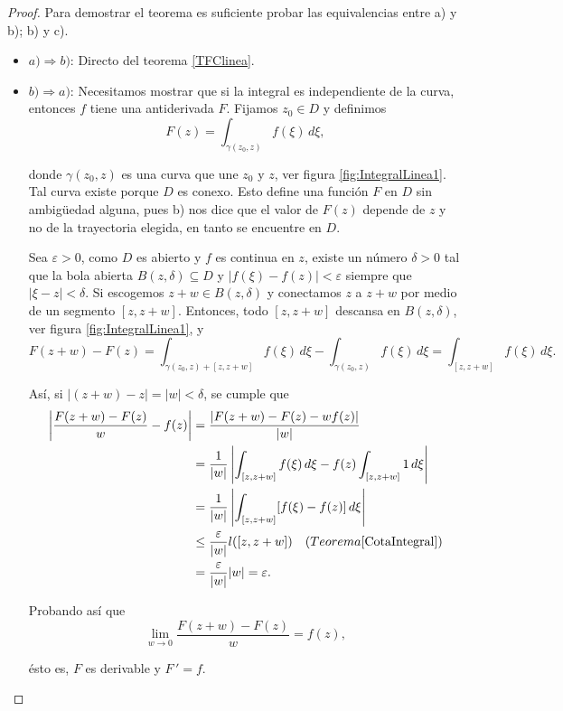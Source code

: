 \begin{proof}
Para demostrar el teorema es suficiente probar las equivalencias entre a) y b); b) y c).

\begin{itemize}
    \item $a) \Rightarrow b)$: Directo del teorema \ref{TFClinea}.
    
    \item $b) \Rightarrow a)$: Necesitamos mostrar que si la integral es independiente de la curva, entonces $f$ tiene una antiderivada $F$. Fijamos $z_0 \in D$ y definimos
    $$F(z) = \int_{\gamma(z_0,z)} f(\xi) \,d\xi,$$
    
    donde $\gamma(z_0,z)$ es una curva que une $z_0$ y $z$, ver figura \ref{fig:IntegralLinea1}. Tal curva existe porque $D$ es conexo. Esto define una función $F$ en $D$ sin ambigüedad alguna, pues b) nos dice que el valor de $F(z)$ depende de $z$ y no de la trayectoria elegida, en tanto se encuentre en $D$. 
    
    Sea $\varepsilon > 0$, como $D$ es abierto y $f$ es continua en $z$, existe un número $\delta > 0$ tal que la bola abierta $B(z, \delta) \subseteq D$ y $|f(\xi) - f(z)| < \varepsilon$ siempre que $|\xi - z| < \delta$. Si escogemos $z+w \in B(z, \delta)$ y conectamos $z$ a $z+w$ por medio de un segmento $[z,z+w]$. Entonces, todo $[z,z+w]$ descansa en $B(z,\delta)$, ver figura \ref{fig:IntegralLinea1},  y
    $$F(z+w) - F(z) = \int_{\gamma(z_0,z) + [z,z+w]} f(\xi) \,d\xi - \int_{\gamma(z_0,z)} f(\xi) \,d\xi = \int_{[z,z+w]} f(\xi) \,d\xi.$$
    
    Así, si $|(z+w)-z| = |w| < \delta$, se cumple que
    \begin{align*}
       \left|\frac{F(z+w)-F(z)}{w} - f(z)\right| &=  \frac{|F(z+w) - F(z) - w f(z)|}{|w|} \\
       &= \frac{1}{|w|} \left| \int_{[z,z+w]} f(\xi) \,d\xi -f(z) \int_{[z,z+w]} 1 \,d\xi  \right| \\
       &= \frac{1}{|w|} \left| \int_{[z,z+w]} [f(\xi) - f(z)] \,d\xi   \right| \\
       &\leq \frac{\varepsilon}{|w|}l([z,z+w]) \quad (Teorema \ref{CotaIntegral})\\
       &= \frac{\varepsilon}{|w|} |w| = \varepsilon.
    \end{align*}

Probando así que
$$\lim_{w \to 0} \frac{F(z+w)- F(z)}{w} = f(z),$$

ésto es, $F$ es derivable y $F\,' = f$.


\end{itemize}
\end{proof}

